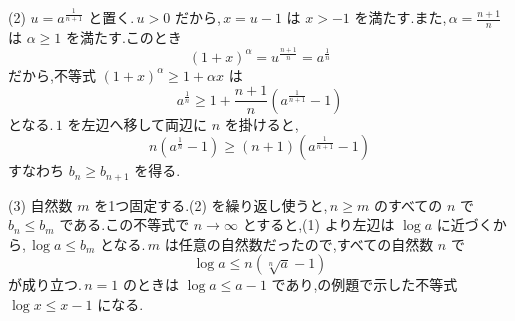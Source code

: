 (2) $u=a^{\frac1{n+1}}$ と置く.\,$u>0$ だから,\,$x=u-1$ は $x>-1$ を満たす.また,\,$\alpha=\frac{n+1}{n}$ は $\alpha\ge1$ を満たす.このとき
\[
 (1+x)^\alpha=u^{\frac{n+1}{n}}=a^{\frac1n}
\]
だから,不等式 $(1+x)^\alpha\ge1+\alpha x$ は
\[
 a^{\frac1n}\ge1+\frac{n+1}{n}\left(a^{\frac1{n+1}}-1\right)
\]
となる.\,$1$ を左辺へ移して両辺に $n$ を掛けると,
\[
 n\left(a^{\frac1n}-1\right)\ge(n+1)\left(a^{\frac1{n+1}}-1\right)
\]
すなわち $b_n\ge b_{n+1}$ を得る.

(3) 自然数 $m$ を1つ固定する.(2) を繰り返し使うと,\,$n\ge m$ のすべての $n$ で $b_n\le b_m$ である.この不等式で $n\to\infty$ とすると,(1) より左辺は $\log a$ に近づくから,\,$\log a\le b_m$ となる.\,$m$ は任意の自然数だったので,すべての自然数 $n$ で
\[
 \log a\le n\left(\sqrt[n]{a}-1\right)
\]
が成り立つ.\,$n=1$ のときは $\log a\le a-1$ であり,の例題で示した不等式 $\log x\le x-1$ になる.
